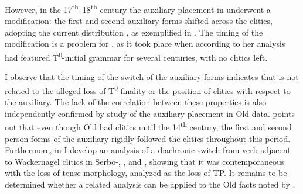 \documentclass[output=paper,modfonts,newtxmath,hidelinks]{langscibook}
\begin{document}
\ea \label{11:ex12}
	\label{11:ex12a}
	\label{11:ex12b}
	\z
\z
However, in the 17\textsuperscript{th}--18\textsuperscript{th} century the auxiliary placement in  underwent a modification: the first and second auxiliary forms shifted across the  clitics, adopting the current distribution \citep[76--77]{slawski1946}, as exemplified in . The timing of the modification is a problem for \citet{pancheva2005}, as it took place when according to her analysis  had featured T\textsuperscript{0}{}-initial grammar for several centuries, with no  clitics left.

\ea \label{11:ex13}
	\label{11:ex13a}
	\label{11:ex13b}
 	\z
 \z
I observe that the timing of the switch of the auxiliary forms indicates that  is not related to the alleged loss of T\textsuperscript{0}{}-finality or the position of  clitics with respect to the auxiliary. The lack of the correlation between these properties is also independently confirmed by  study of the auxiliary placement in Old  data. \citeauthor{jung2015} points out that even though Old  had  clitics until the 14\textsuperscript{th} century, the first and second person forms of the auxiliary rigidly followed the  clitics throughout this period. Furthermore, in \citet{migdalski2015,migdalski2016} I develop an analysis of a diachronic switch from verb-adjacent to Wackernagel clitics in Serbo-, , and , showing that it was contemporaneous with the loss of tense morphology, analyzed as the loss of TP. It remains to be determined whether a related analysis can be applied to the Old  facts noted by \citet{pancheva2005}.
\end{document}
